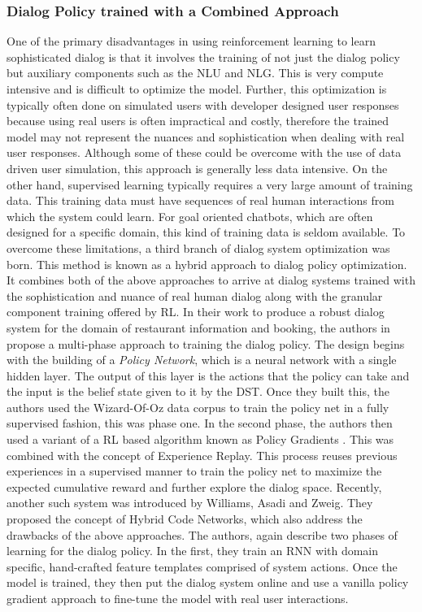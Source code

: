 \documentclass[12pt]{extarticle}
\numberwithin{equation}{section}
\begin{document}
	\subsubsection{Dialog Policy trained with a Combined Approach}
	One of the primary disadvantages in using reinforcement learning to learn sophisticated dialog is that it involves the training of not just the dialog policy but auxiliary components such as the NLU and NLG. This is very compute intensive and is difficult to optimize the model. Further, this optimization is typically often done on simulated users with developer designed user responses because using real users is often impractical and costly, therefore the trained model may not represent the nuances and sophistication when dealing with real user responses.
	Although some of these could be overcome with the use of data driven user simulation, this approach is generally less data intensive.
	On the other hand, supervised learning typically requires a very large amount of training data. This training data must have sequences of real human interactions from which the system could learn. For goal oriented chatbots, which are often designed for a specific domain, this kind of training data is seldom available. To overcome these limitations, a third branch of dialog system optimization was born. This method is known as a hybrid approach to dialog policy optimization. It combines both of the above approaches to arrive at dialog systems trained with the sophistication and nuance of real human dialog along with the granular component training offered by RL. In their work to produce a robust dialog system for the domain of restaurant information and booking, the authors in \cite{Su_continous_dm} propose a multi-phase approach to training the dialog policy. The design begins with the building of a \textit{Policy Network}, which is a neural network with a single hidden layer. The output of this layer is the actions that the policy can take and the input is the belief state given to it by the DST. Once they built this, the authors used the Wizard-Of-Oz data corpus to train the policy net in a fully supervised fashion, this was phase one. In the second phase, the authors then used a variant\cite{Schulman_trpo} of a RL based algorithm known as Policy Gradients \cite{Sutton_pg}. This was combined with the concept of Experience Replay\cite{Lin1992}. This process reuses previous experiences in a supervised manner to train the policy net to maximize the expected cumulative reward and further explore the dialog space. Recently, another such system was introduced by Williams, Asadi and Zweig. They proposed the concept of Hybrid Code Networks\cite{Williams_HCN_e2e}, which also address the drawbacks of the above approaches. The authors, again describe two phases of learning for the dialog policy. In the first, they train an RNN with domain specific, hand-crafted feature templates comprised of system actions. Once the model is trained, they then put the dialog system online and use a vanilla policy gradient\cite{Sutton_pg} approach to fine-tune the model with real user interactions. 
	\pagebreak
\end{document}
